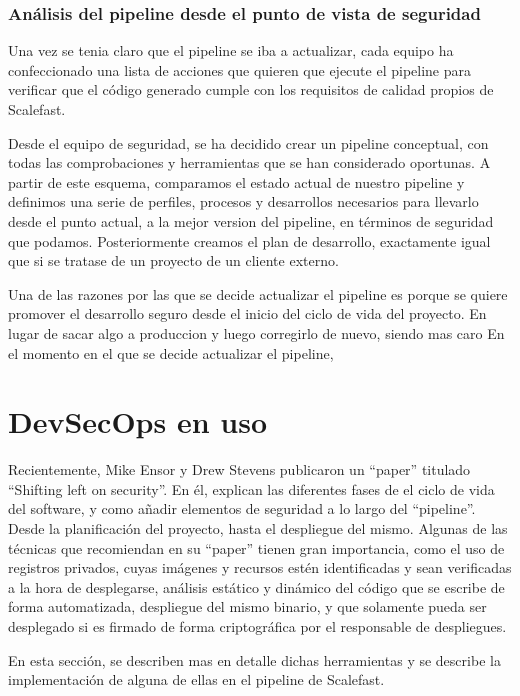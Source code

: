 \documentclass[12pt]{report} %
\begin{document}
\subsubsection{Análisis del \gls{pipeline} desde el punto de vista de seguridad}

Una vez se tenia claro que el \gls{pipeline} se iba a actualizar, cada equipo ha confeccionado una lista de acciones que quieren que ejecute el \gls{pipeline} para verificar que el código generado cumple con los requisitos de calidad propios de Scalefast.

Desde el equipo de seguridad, se ha decidido crear un \gls{pipeline} conceptual, con todas las comprobaciones y herramientas que se han considerado oportunas.
A partir de este esquema, comparamos el estado actual de nuestro \gls{pipeline} y definimos una serie de perfiles, procesos y desarrollos necesarios para llevarlo desde el punto actual, a la mejor version del pipeline, en términos de seguridad que podamos.
Posteriormente creamos el plan de desarrollo, exactamente igual que si se tratase de un proyecto de un cliente externo.

Una de las razones por las que se decide actualizar el \gls{pipeline} es porque se quiere promover el desarrollo seguro desde el inicio del ciclo de vida del proyecto.
En lugar de sacar algo a produccion y luego corregirlo de nuevo, siendo mas caro
En el momento en el que se decide actualizar el \gls{pipeline}, 

\section{DevSecOps en uso}

Recientemente, Mike Ensor y Drew Stevens publicaron un ``paper'' titulado ``Shifting left on security''.
En él, explican las diferentes fases de el ciclo de vida del software, y como añadir elementos de seguridad a lo largo del ``pipeline''. 
Desde la planificación del proyecto, hasta el despliegue del mismo.
Algunas de las técnicas que recomiendan en su ``paper'' tienen gran importancia, como el uso de registros privados, cuyas imágenes y recursos estén identificadas y sean verificadas a la hora de desplegarse, análisis estático y dinámico del código que se escribe de forma automatizada, despliegue del mismo binario, y que solamente pueda ser desplegado si es firmado de forma criptográfica por el responsable de despliegues.\cite{Ensor2021}

En esta sección, se describen mas en detalle dichas herramientas y se describe la implementación de alguna de ellas en el \gls{pipeline} de Scalefast.

\clearpage

\printglossary[type=\acronymtype]

\printglossary




\end{document}
